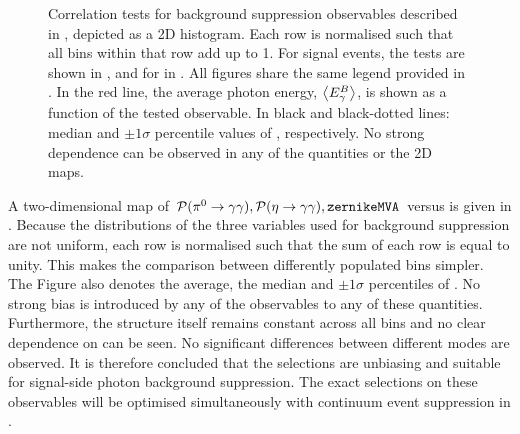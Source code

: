 \begin{figure}[htbp!]
{        }
    \caption{\label{fig:selection_correlations} Correlation tests for background suppression observables described in , depicted as a 2D histogram.
    Each row is normalised such that all bins within that row add up to 1.
    For signal \BptoXsgamma events, the tests are shown
    in ,
    and for \BztoXsgamma in .
    All figures share the same legend provided in .
    In the red line, the average photon energy, $\expval{{\ensuremath{E^B_{\gamma}}}}$, is shown as a function of the tested observable.
    In black and black-dotted lines: median and $\pm 1 \sigma$ percentile values of \EB, respectively.
    No strong dependence can be observed in any of the quantities or the 2D maps.
    }
\end{figure}

A two-dimensional map of ${{\mathcal{P}(\pi^0\rightarrow\gamma\gamma)},{\mathcal{P}(\eta\rightarrow\gamma\gamma)},{\texttt{zernikeMVA}}}$ versus \EB is given in .
Because the distributions of the three variables used for background suppression are not uniform, each row is normalised such that the sum of each row is equal to unity.
This makes the comparison between differently populated bins simpler.
The Figure also denotes the average, the median and $\pm 1\sigma$ percentiles of \EB.
No strong bias is introduced by any of the observables to any of these quantities.
Furthermore, the structure itself remains constant across all bins and no clear dependence on \EB can be seen.
No significant differences between different \FEI modes are observed.
It is therefore concluded that the selections are unbiasing and suitable for signal-side photon background suppression.
The exact selections on these observables will be optimised simultaneously with continuum event suppression in .